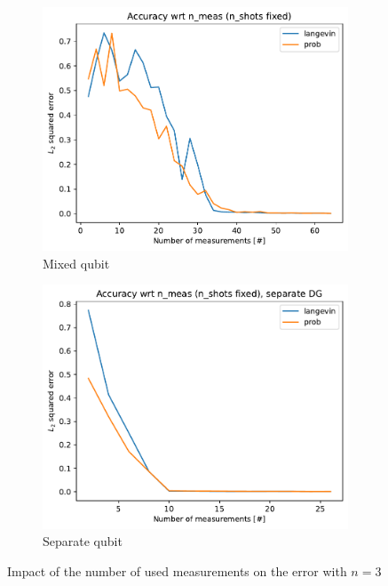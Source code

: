 \documentclass[12pt]{memoir}
\begin{document}
\begin{figure}[H]
    \centering
    \begin{subfigure}[b]{0.49\textwidth}
        \centering
        \includegraphics[width=\textwidth]{figures/experiments/meas/meas_acc_comp_meas-1.png}
        \caption{Mixed qubit}
        \label{fig:meas-comp-mixed-sub}
    \end{subfigure}
    \hfill
    \begin{subfigure}[b]{0.49\textwidth}
        \centering
        \includegraphics[width=\textwidth]{figures/experiments/meas/meas_acc_comp_meas_sep-1.png}
        \caption{Separate qubit}
        \label{fig:meas-comp-sep-sub}
    \end{subfigure}
    \caption{Impact of the number of used measurements on the error with $n=3$}
    \label{fig:meas-comp}
\end{figure}
\end{document}
